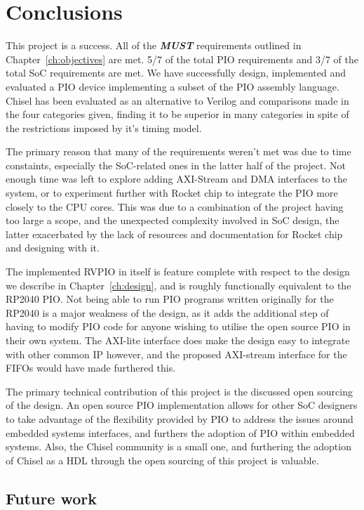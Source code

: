 \chapter{Conclusions}
\label{ch:conclusions}

This project is a success. All of the \textit{\textbf{MUST}} requirements outlined in Chapter~\ref{ch:objectives} are met. 5/7 of the total PIO requirements and 3/7 of the total SoC requirements are met. We have successfully design, implemented and evaluated a PIO device implementing a subset of the PIO assembly language. Chisel has been evaluated as an alternative to Verilog and comparisons made in the four categories given, finding it to be superior in many categories in spite of the restrictions imposed by it's timing model.

The primary reason that many of the requirements weren't met was due to time constaints, especially the SoC-related ones in the latter half of the project. Not enough time was left to explore adding AXI-Stream and DMA interfaces to the system, or to experiment further with Rocket chip to integrate the PIO more closely to the CPU cores. This was due to a combination of the project having too large a scope, and the unexpected complexity involved in SoC design, the latter exacerbated by the lack of resources and documentation for Rocket chip and designing with it.

The implemented RVPIO in itself is feature complete with respect to the design we describe in Chapter~\ref{ch:design}, and is roughly functionally equivalent to the RP2040 PIO. Not being able to run PIO programs written originally for the RP2040 is a major weakness of the design, as it adds the additional step of having to modify PIO code for anyone wishing to utilise the open source PIO in their own system. The AXI-lite interface does make the design easy to integrate with other common IP however, and the proposed AXI-stream interface for the FIFOs would have made furthered this.

The primary technical contribution of this project is the discussed open sourcing of the design. An open source PIO implementation allows for other SoC designers to take advantage of the flexibility provided by PIO to address the issues around embedded systems interfaces, and furthers the adoption of PIO within embedded systems. Also, the Chisel community is a small one, and furthering the adoption of Chisel as a HDL through the open sourcing of this project is valuable.

\section{Future work}

